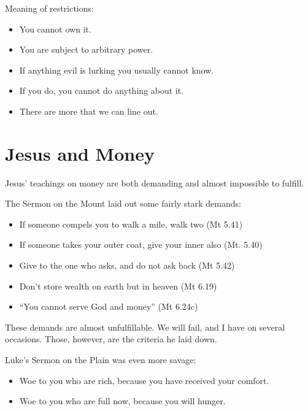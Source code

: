 \documentclass{beamer}
\begin{document}
\begin{frame}
  Meaning of restrictions:\pause
  \begin{itemize}
	\item You cannot own it.\pause
	\item You are subject to arbitrary power.\pause
	\item If anything evil is lurking you usually cannot know.\pause
	\item If you do, you cannot do anything about it.\pause
	\item There are more that we can line out.
  \end{itemize}
\end{frame}

\section{Jesus and Money}

\begin{frame}
  Jesus' teachings on money are both demanding and almost impossible to fulfill.
\end{frame}

\begin{frame}
  The Sermon on the Mount laid out some fairly stark demands:\pause
  \begin{itemize}
	\item If someone compels you to walk a mile, walk two (Mt 5.41)\pause
	\item If someone takes your outer coat, give your inner also (Mt. 5.40)\pause
	\item Give to the one who asks, and do not ask back (Mt 5.42)\pause
	\item Don't store wealth on earth but in heaven (Mt 6.19)\pause
	\item ``You cannot serve God and money'' (Mt 6.24c)
  \end{itemize}
\end{frame}

\begin{frame}
  These demands are almost unfulfillable.
  We will fail, and I have on several occasions.
  Those, however, are the criteria he laid down.
\end{frame}

\begin{frame}
  Luke's Sermon on the Plain was even more savage:
  \begin{itemize}
	\item Woe to you who are rich, because you have received your comfort.
	\item Woe to you who are full now, because you will hunger.
  \end{itemize}
\end{frame}
\end{document}
